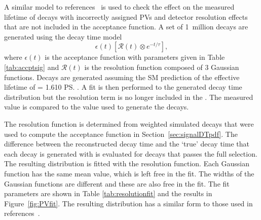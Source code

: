 A similar model to references~\cite{Aaij:2016ohx,Aaij:2015vza} is used to check the effect on the measured lifetime of decays with incorrectly assigned PVs and detector resolution effects that are not included in the acceptance function. A set of 1~million decays are generated using the decay time model 
\begin{equation}
\epsilon (t) [\mathcal{R}(t) \otimes e^{-t/\tau}],
\end{equation}
where $\epsilon (t)$ is the acceptance function with parameters given in Table \ref{tab:accptsig} and $\mathcal{R}(t)$ is the resolution function composed of 3 Gaussian functions. 
Decays are generated assuming the SM prediction of the \bsmumu effective lifetime of \tmumu = 1.610 \ps. A fit is then performed to the generated decay time distribution but  the resolution term is no longer included in the \pdf. The measured \tmumu value is compared to the value used to generate the decays. 


The resolution function is determined from weighted simulated \bsmumu decays that were used to compute the acceptance function in Section~\ref{sec:signalDTpdf}. The difference between the reconstructed decay time and the `true' decay time that each decay is generated with is evaluated for decays that passes the full selection. The resulting distribution is fitted with the resolution function. Each Gaussian function has the same mean value, which is left free in the fit. The widths of the Gaussian functions are different and these are also free in the fit. The fit parameters are shown in Table \ref{tab:resolutionfit} and the results in Figure~\ref{fig:PVfit}. %
The resulting distribution has a similar form to those used in references~\cite{Aaij:2016ohx,Aaij:2015vza}. %


